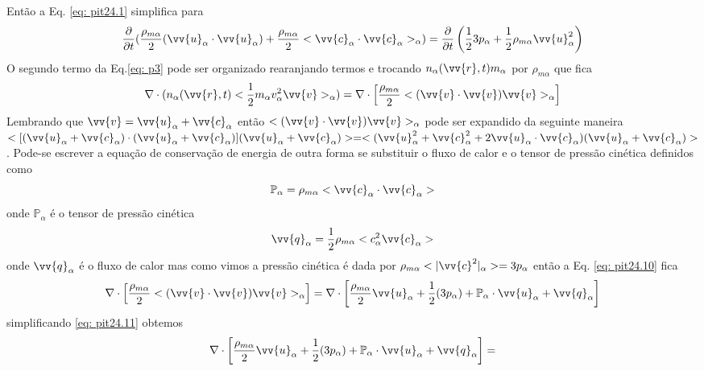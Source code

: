 \documentclass[12pt,oneside,a4paper]{abntex2}
\begin{document}
Então a Eq. \ref{eq: pit24.1} simplifica para 
\begin{equation}
\label{eq: pit24.12}
\frac{\partial }{\partial t}(\frac{\rho_{m\alpha}}{2}(\vv{u}_\alpha \cdot \vv{u}_\alpha) + \frac{\rho_{m\alpha}}{2}<\vv{c}_\alpha \cdot \vv{c}_\alpha>_\alpha)=\frac{\partial }{\partial t}  \left( \frac{1}{2} 3p_\alpha+\frac{1}{2} \rho_{m\alpha}\vv{u}^2_\alpha \right) 
\end{equation} 
O segundo termo da Eq.\ref{eq: p3} pode ser organizado rearanjando termos e trocando $ n_\alpha(\vv{r},t) m_\alpha$ por $\rho_{m\alpha}$ que fica
\begin{equation}
\label{eq: pit24.10}
\nabla \cdot (n_\alpha(\vv{r},t)<\frac{1}{2}m_\alpha v_{\alpha}^2 \vv{v} >_\alpha) = \nabla \cdot \left[ \frac{\rho_{m\alpha}}{2}<(\vv{v} \cdot \vv{v})\vv{v}>_\alpha \right]
\end{equation}
Lembrando que $\vv{v} = \vv{u}_\alpha + \vv{c}_\alpha$ então  $<(\vv{v} \cdot \vv{v})\vv{v}>_\alpha$ pode ser expandido da seguinte maneira $
<[(\vv{u}_\alpha + \vv{c}_\alpha) \cdot (\vv{u}_\alpha + \vv{c}_\alpha)](\vv{u}_\alpha + \vv{c}_\alpha)> = <(\vv{u}^2_\alpha + \vv{c}^2_\alpha+2\vv{u}_\alpha \cdot \vv{c}_\alpha)(\vv{u}_\alpha + \vv{c}_\alpha)>$. Pode-se escrever a equação de conservação de energia de outra forma se substituir o fluxo de calor e o tensor de pressão cinética definidos como
\begin{equation}
\mathbb{P}_\alpha = \rho_{m\alpha}<\vv{c}_\alpha \cdot \vv{c}_\alpha> 
\end{equation}
onde $\mathbb{P}_\alpha$ é o tensor de pressão cinética
\begin{equation}
\vv{q}_\alpha = \frac{1}{2} \rho_{m\alpha} <c^2_\alpha  \vv{c}_\alpha>
\end{equation}
onde $\vv{q}_\alpha$ é o fluxo de calor
mas como vimos a pressão cinética é dada por $\rho_{m\alpha}<|\vv{c}^2|_\alpha>=3p_\alpha$ então a Eq. \ref{eq: pit24.10} fica
\begin{equation}
\label{eq: pit24.11}
\nabla \cdot \left[ \frac{\rho_{m\alpha}}{2}<(\vv{v} \cdot \vv{v})\vv{v}>_\alpha \right]= \nabla \cdot \left[ \frac{\rho_{m\alpha}}{2}\vv{u}_\alpha+\frac{1}{2}(3p_\alpha) + \mathbb{P}_\alpha \cdot \vv{u}_\alpha + \vv{q}_\alpha \right]
\end{equation}
simplificando \ref{eq: pit24.11} obtemos
\begin{equation}
\label{eq: pit24.13}
\nabla \cdot \left[ \frac{\rho_{m\alpha}}{2}\vv{u}_\alpha+\frac{1}{2}(3p_\alpha) + \mathbb{P}_\alpha \cdot \vv{u}_\alpha + \vv{q}_\alpha \right] = 
\end{equation} 
\end{document}
